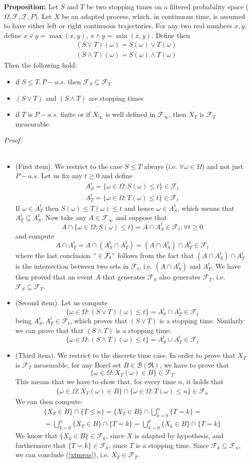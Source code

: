 \documentclass[a4paper,10pt]{report}
\theoremstyle{plain}
\theoremstyle{definition}
\newcommand\be{\begin{eqnarray}}    %
\newcommand\ee{\end{eqnarray}}
\newcommand{\PROP} {{\bf{Proposition: }}}
\newcommand{\PROOF} {{\emph{Proof: \\ \\}}}
\newcommand{\FF} {\mathcal{F} }
\newcommand{\BOREL} {{\mathcal{B}(\Re)} }
\newcommand{\FLT} {\underline{\mathcal{F}}}
\begin{document}
\PROP Let $S$ and $T$ be two stopping times on a filtered probability space ($\Omega, \FF, \FLT, P$). Let $X$ be an adapted process, which, in continuous time, is assumed to have either left or right continuous trajectories. For any two real numbers $x, y$, define $x\vee y=\max(x,y)$, $x\wedge y=\min(x,y)$. Define then
\be
(S\vee T)(\omega)=S(\omega)\vee T(\omega) \\
(S\wedge T)(\omega)=S(\omega)\wedge T(\omega)
\ee
Then the following hold:
\begin{itemize}
\item if $S\leq T, P-a.s.$ then $\FF_S\subseteq \FF_T$
\item $(S\vee T)$ and $(S\wedge T)$ are stopping times
\item if $T$ is $P-a.s.$ finite or if $X_\infty$ is well defined in $\FF_\infty$, then $X_T$ is $\FF_T$ measurable.
\end{itemize}
\PROOF
\begin{itemize}
\item (First item). We restrict to the case $S\leq T$ always (i.e. $\forall \omega\in \Omega$) and not just $P-a.s.$ Let us fix any $t\geq 0$ and define
\be
A_S^t= \{\omega\in \Omega: S(\omega)\leq t\}\in \FF_t\\
A_T^t= \{\omega\in \Omega: T(\omega)\leq t\}\in \FF_t
\ee
If $\omega \in A_T^t$ then $S(\omega)\leq T(\omega)\leq t$ and hence $\omega\in A_S^t$, which means that $A_T^t \subseteq A_S^t$. Now take any $A\in \FF_\infty$ and suppose that 
\[
A\cap \{\omega\in \Omega: S(\omega)\leq t\}=A\cap  A_S^t \in \FF_t, \forall t\geq 0
\]
and compute
\[
A\cap A_T^t=A\cap (A_S^t \cap A_T^t)=(A\cap A_S^t) \cap A_T^t\in \FF_t
\] 
where the last conclusion $"\in \FF_t "$ follows from the fact that $(A\cap A_S^t) \cap A_T^t$ is the intersection between two sets in $\FF_t$, i.e.  $(A\cap A_S^t)$ and $A_T^t$. We have then proved that an event $A$ that generates $\FF_S$ also generates $\FF_T$, i.e. $\FF_S\subseteq \FF_T$.
\item (Second item). Let us compute
\[
\{\omega\in \Omega: (S\vee T)(\omega)\leq t\}=A_S^t \cap A_T^t\in \FF_t
\]
being $A_S^t, A_T^t\in \FF_t$, which proves that $(S\vee T)$ is a stopping time.
Similarly we can prove that that $(S\wedge T)$ is a stopping time:
\[
\{\omega\in \Omega: (S\wedge T)(\omega)\leq t\}=A_S^t \cup A_T^t\in \FF_t
\]
\item (Third item). We restrict to the discrete time case. In order to prove that $X_T$ is $\FF_T$ measurable, for any Borel set $B\in \BOREL$, we have to prove that 
\[
\{\omega\in \Omega: X_T(\omega)\in B\}\in \FF_T
\]
This means that we have to show that, for every time $n$, it holds that
\be
\{\omega\in \Omega: X_T(\omega)\in B\}\cap \{\omega\in \Omega: T(\omega)\leq n\}\in \FF_n
\label{xtmeas}
\ee
We can then compute:
\be
\{X_T\in B\}\cap \{T\leq n\}=\{X_T\in B\}\cap\bigcup_{k=0}^n \{T= k\}=\\
=\bigcup_{k=0}^n \{X_T\in B\}\cap \{T= k\}=\bigcup_{k=0}^n \{X_k\in B\}\cap \{T= k\}
\ee
We know that $\{X_k\in B\}\in \FF_k$, since $X$ is adapted by hypothesis, and furthermore that $\{T= k\}\in \FF_k$, since $T$ is a stopping time. Since $\FF_k\subseteq \FF_n$, we can conclude (\ref{xtmeas}), i.e. $X_T\in \FF_T$.
\end{itemize}
\end{document}
